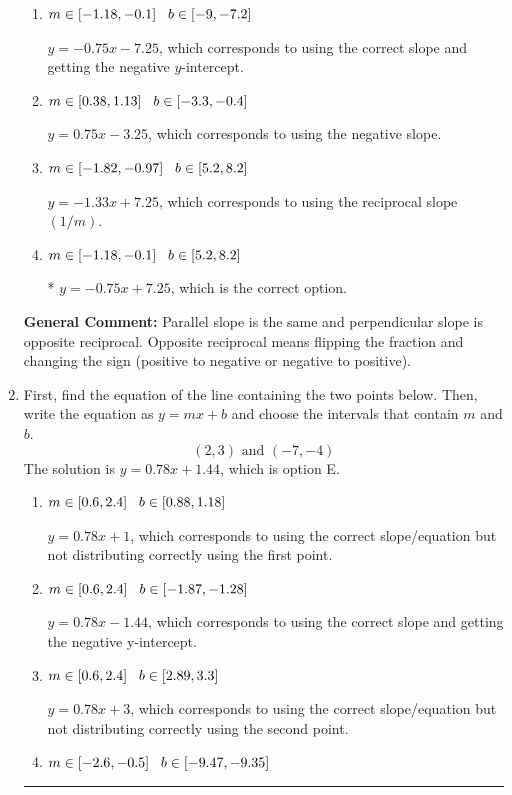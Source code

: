 \documentclass{extbook}[14pt]
\newcommand{\litem}[1]{\item #1

\rule{\textwidth}{0.4pt}}
\begin{document}
\begin{enumerate}
{\begin{enumerate}[label=\Alph*.]
 $y = -0.75x - 5.00$, which corresponds to correct slope and mis-distributing while simplifying to slope-intercept form.
\item \( m \in [-1.18, -0.1] \hspace*{3mm} b \in [-9, -7.2] \)

 $y = -0.75x - 7.25$, which corresponds to using the correct slope and getting the negative $y$-intercept.
\item \( m \in [0.38, 1.13] \hspace*{3mm} b \in [-3.3, -0.4] \)

 $y = 0.75x - 3.25$, which corresponds to using the negative slope.
\item \( m \in [-1.82, -0.97] \hspace*{3mm} b \in [5.2, 8.2] \)

 $y = -1.33x + 7.25$, which corresponds to using the reciprocal slope $(1/m)$.
\item \( m \in [-1.18, -0.1] \hspace*{3mm} b \in [5.2, 8.2] \)

* $y = -0.75x + 7.25$, which is the correct option.
\end{enumerate}

\textbf{General Comment:} Parallel slope is the same and perpendicular slope is opposite reciprocal. Opposite reciprocal means flipping the fraction and changing the sign (positive to negative or negative to positive).
}
\litem{
First, find the equation of the line containing the two points below. Then, write the equation as $ y=mx+b $ and choose the intervals that contain $m$ and $b$.
\[ (2, 3) \text{ and } (-7, -4) \]The solution is \( y = 0.78x + 1.44 \), which is option E.\begin{enumerate}[label=\Alph*.]
\item \( m \in [0.6, 2.4] \hspace*{3mm} b \in [0.88, 1.18] \)

 $y = 0.78x + 1$, which corresponds to using the correct slope/equation but not distributing correctly using the first point.
\item \( m \in [0.6, 2.4] \hspace*{3mm} b \in [-1.87, -1.28] \)

 $y = 0.78x -1.44$, which corresponds to using the correct slope and getting the negative y-intercept.
\item \( m \in [0.6, 2.4] \hspace*{3mm} b \in [2.89, 3.3] \)

 $y = 0.78x + 3$, which corresponds to using the correct slope/equation but not distributing correctly using the second point.
\item \( m \in [-2.6, -0.5] \hspace*{3mm} b \in [-9.47, -9.35] \)


\end{enumerate}}
\end{enumerate}
\end{document}
